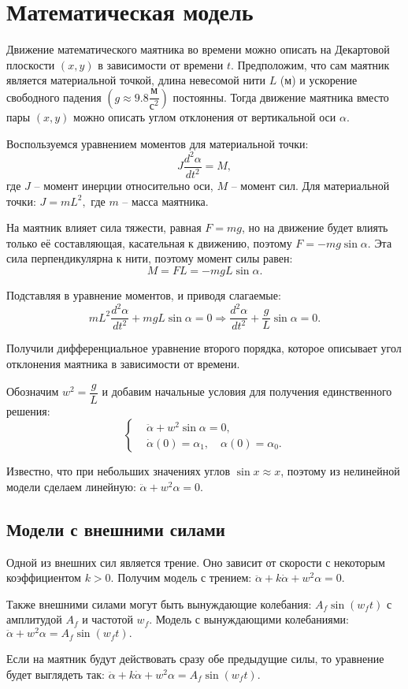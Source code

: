 \section{Математическая модель}
    Движение математического маятника во времени можно описать на Декартовой плоскости $ (x, y) $ в зависимости от времени \( t \). Предположим, что сам маятник является материальной точкой, длина невесомой нити \( L \) (м) и ускорение свободного падения \(\left( g \approx 9.8 \dfrac{\text{м}}{\text{с}^2} \right) \) постоянны. Тогда движение маятника вместо пары \((x, y) \) можно описать углом отклонения от вертикальной оси \( \alpha \).

    Воспользуемся уравнением моментов для материальной точки:
    \[
        J \dfrac{d^2 \alpha}{dt^2} = M,
    \]
    где $ J $ -- момент инерции относительно оси, $ M $ -- момент сил. Для материальной точки: \( J = mL^2, \) где $ m $ -- масса маятника. 

    На маятник влияет сила тяжести, равная \( F = mg \), но на движение будет влиять только её составляющая, касательная к движению, поэтому \( F = -mg \sin \alpha \). Эта сила перпендикулярна к нити, поэтому момент силы равен:
    \[
        M = FL = - mgL \sin \alpha.
    \]

    Подставляя в уравнение моментов, и приводя слагаемые:
    \[
        mL^2 \dfrac{d^2 \alpha}{dt^2} + mgL \sin \alpha = 0 \Rightarrow \dfrac{d^2 \alpha}{dt^2} + \dfrac{g}{L} \sin \alpha = 0.
    \]

    Получили дифференциальное уравнение второго порядка, которое описывает угол отклонения маятника в зависимости от времени.
    
    Обозначим \( w^2 = \dfrac{g}{L} \) и добавим начальные условия для получения единственного решения:
    \[
        \begin{cases}
            & \ddot{\alpha} + w^2 \sin \alpha = 0, \\
            & \dot{\alpha}(0) = \alpha_1, \quad \alpha(0) = \alpha_0.
        \end{cases}
    \]
    
    Известно, что при небольших значениях углов \( \sin x \approx x \), поэтому из нелинейной модели сделаем линейную: \( \ddot{\alpha} + w^2 \alpha = 0. \)

    \subsection{Модели с внешними силами}
        Одной из внешних сил является трение. Оно зависит от скорости с некоторым коэффициентом $ k > 0 $. Получим модель с трением: \( \ddot{\alpha} + k \dot{\alpha} + w^2 \alpha = 0. \)

        Также внешними силами могут быть вынуждающие колебания: \( A_f \sin \left( w_f t \right) \) с амплитудой \( A_f \) и частотой \( w_f \). Модель с вынуждающими колебаниями:\\ \( \ddot{\alpha} + w^2 \alpha = A_f \sin \left( w_f t \right). \)

        Если на маятник будут действовать сразу обе предыдущие силы, то уравнение будет выглядеть так: \( \ddot{\alpha}  + k \dot{\alpha} + w^2 \alpha = A_f \sin \left( w_f t \right). \)